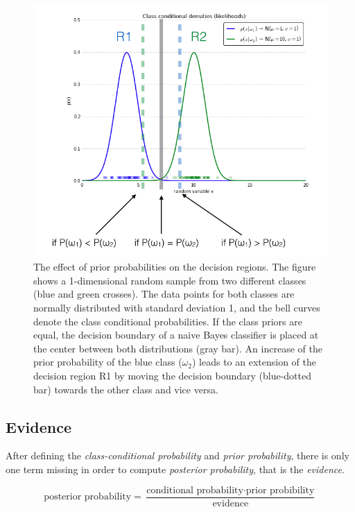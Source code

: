 \documentclass{article}
\begin{document}
\begin{figure}[h!]
\includegraphics[width=\linewidth]{../images/effect_priors_1.png}
\caption{The effect of prior probabilities on the decision regions. The figure shows a 1-dimensional random sample from two different classes (blue and green crosses). The data points for both classes are normally distributed with standard deviation 1, and the bell curves denote the class conditional probabilities. If the class priors are equal, the decision boundary of a naive Bayes classifier is placed at the center between both distributions (gray bar). An increase of the prior probability of the blue class ($\omega_2$) leads to an extension of the decision region R1 by moving the decision boundary (blue-dotted bar) towards the other class and vice versa.}
\label{fig:effect_priors}
\end{figure}



\subsection{Evidence}
\label{sec:evidence}

After defining the \emph{class-conditional probability} and \emph{prior probability}, there is only one term missing in order to compute \emph{posterior probability}, that is the \emph{evidence}.

\begin{equation} \text{posterior probability} = \frac{\text{conditional probability} \cdot \text{prior probibility}}{\text{evidence}} \end{equation}
\end{document}
